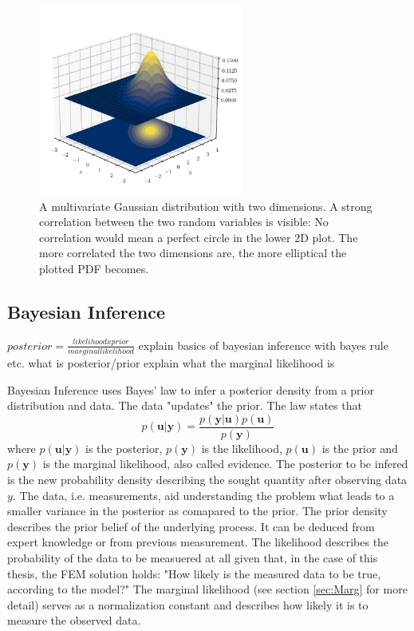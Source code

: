\documentclass[%
  a4paper,oneside,%
  11pt,%
  smallchapters,
  style=printdev,
  extramargin,
  green,%
  rgb, <cmyk>
  ]{tubsbook}
\begin{document}
\begin{figure}[!ht]
\begin{center}
\includegraphics[width=0.6\textwidth]{pics/Gaussians}
\caption{A multivariate Gaussian distribution with two dimensions. A strong correlation between the two random variables is visible: No correlation would mean a perfect circle in the lower 2D plot. The more correlated the two dimensions are, the more elliptical the plotted PDF becomes. \cite{Virtanen2020} }
\label{fig:MultiGauss}
\end{center}
\end{figure}

\subsection{Bayesian Inference}
$posterior = \frac{likelihood x prior}{marginal likelihood}$ \cite{rasmussen2006}
explain basics of bayesian inference with bayes rule etc. what is posterior/prior 
explain what the marginal likelihood is

Bayesian Inference uses Bayes' law to infer a posterior density from a prior distribution and data. The data "updates" the prior. The law states that
\begin{equation}
p(\bm{u}|\bm{y}) = \frac{p(\bm{y}|\bm{u})p(\bm{u})}{p(\bm{y})}
\end{equation}
where $p(\bm{u}|\bm{y})$ is the posterior, $p(\bm{y})$ is the likelihood, $p(\bm{u})$ is the prior and $p(\bm{y})$ is the marginal likelihood, also called evidence. The posterior to be infered is the new probability density describing the sought quantity after observing data $y$. The data, i.e. measurements, aid understanding the problem what leads to a smaller variance in the posterior as comapared to the prior. The prior density describes the prior belief of the underlying process. It can be deduced from expert knowledge or from previous measurement. 
The likelihood describes the probability of the data to be measuered at all given that, in the case of this thesis, the FEM solution holds: "How likely is the measured data to be true, according to the model?"
The marginal likelihood (see section \ref{sec:Marg} for more detail) serves as a normalization constant and describes how likely it is to measure the observed data.
\end{document}
